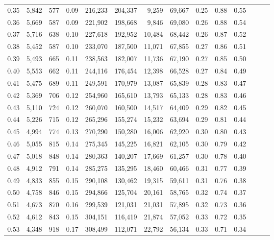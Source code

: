 \begin{tabular}{rrrrrrrrrrrrrr}
0.35 &  5,842 &    577 &  0.09 &  216,233 &  204,337 &   9,259 &  69,667 &  0.25 &  0.88 &      0.55 \\
0.36 &  5,669 &    587 &  0.09 &  221,902 &  198,668 &   9,846 &  69,080 &  0.26 &  0.88 &      0.54 \\
0.37 &  5,716 &    638 &  0.10 &  227,618 &  192,952 &  10,484 &  68,442 &  0.26 &  0.87 &      0.52 \\
0.38 &  5,452 &    587 &  0.10 &  233,070 &  187,500 &  11,071 &  67,855 &  0.27 &  0.86 &      0.51 \\
0.39 &  5,493 &    665 &  0.11 &  238,563 &  182,007 &  11,736 &  67,190 &  0.27 &  0.85 &      0.50 \\
0.40 &  5,553 &    662 &  0.11 &  244,116 &  176,454 &  12,398 &  66,528 &  0.27 &  0.84 &      0.49 \\
0.41 &  5,475 &    689 &  0.11 &  249,591 &  170,979 &  13,087 &  65,839 &  0.28 &  0.83 &      0.47 \\
0.42 &  5,369 &    706 &  0.12 &  254,960 &  165,610 &  13,793 &  65,133 &  0.28 &  0.83 &      0.46 \\
0.43 &  5,110 &    724 &  0.12 &  260,070 &  160,500 &  14,517 &  64,409 &  0.29 &  0.82 &      0.45 \\
0.44 &  5,226 &    715 &  0.12 &  265,296 &  155,274 &  15,232 &  63,694 &  0.29 &  0.81 &      0.44 \\
0.45 &  4,994 &    774 &  0.13 &  270,290 &  150,280 &  16,006 &  62,920 &  0.30 &  0.80 &      0.43 \\
0.46 &  5,055 &    815 &  0.14 &  275,345 &  145,225 &  16,821 &  62,105 &  0.30 &  0.79 &      0.42 \\
0.47 &  5,018 &    848 &  0.14 &  280,363 &  140,207 &  17,669 &  61,257 &  0.30 &  0.78 &      0.40 \\
0.48 &  4,912 &    791 &  0.14 &  285,275 &  135,295 &  18,460 &  60,466 &  0.31 &  0.77 &      0.39 \\
0.49 &  4,833 &    855 &  0.15 &  290,108 &  130,462 &  19,315 &  59,611 &  0.31 &  0.76 &      0.38 \\
0.50 &  4,758 &    846 &  0.15 &  294,866 &  125,704 &  20,161 &  58,765 &  0.32 &  0.74 &      0.37 \\
0.51 &  4,673 &    870 &  0.16 &  299,539 &  121,031 &  21,031 &  57,895 &  0.32 &  0.73 &      0.36 \\
0.52 &  4,612 &    843 &  0.15 &  304,151 &  116,419 &  21,874 &  57,052 &  0.33 &  0.72 &      0.35 \\
0.53 &  4,348 &    918 &  0.17 &  308,499 &  112,071 &  22,792 &  56,134 &  0.33 &  0.71 &      0.34 \\

\end{tabular}
